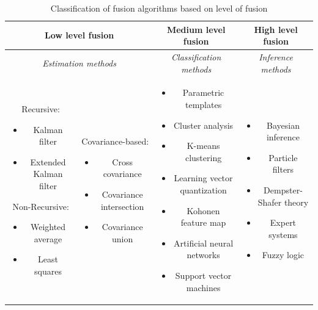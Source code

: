 \begin{table}[ht!]
\footnotesize
\centering
\begin{tabular}{|c|c|c|c|}
\hline
\multicolumn{2}{|c|}{\textbf{Low level fusion}} & \textbf{Medium level fusion} & \textbf{High level fusion} \\
\hline
\multicolumn{2}{|c|}{\textit{Estimation methods}} & \textit{Classification methods} & \textit{Inference methods} \\
\hline
\parbox{2.4cm}{
	Recursive:
	\begin{itemize}[leftmargin=.07in]
		\item Kalman filter
		\item Extended Kalman filter
	\end{itemize}
	Non-Recursive:
	\begin{itemize}[leftmargin=.07in]
		\item Weighted average
		\item Least squares
	\end{itemize}
	}
 & 
 \parbox{2.4cm}{	 
 	Covariance-based:
	\begin{itemize}[leftmargin=.07in]
		\item Cross covariance
		\item Covariance intersection
		\item Covariance union
	\end{itemize}
	}
&
 \parbox{3cm}{	 
	\begin{itemize}[leftmargin=.07in, noitemsep]
		\item Parametric templates
		\item Cluster analysis
		\item K-means clustering
		\item Learning vector quantization
		\item Kohonen feature map
		\item Artificial neural networks
		\item Support vector machines
	\end{itemize}
	}
&
\parbox{2.9cm}{	 
	\begin{itemize}[leftmargin=.07in, noitemsep]
		\item Bayesian inference
		\item Particle filters
		\item Dempster-Shafer theory
		\item Expert systems
		\item Fuzzy logic
	\end{itemize}
	} \\
\hline
\end{tabular}
\caption{Classification of fusion algorithms based on level of fusion}
\label{fusionAlgClasLuo}
\end{table}

